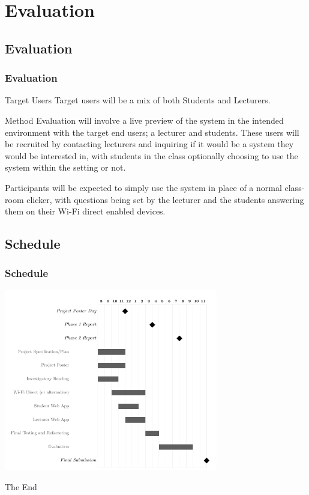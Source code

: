 \documentclass{beamer}
\begin{document}

\section{Evaluation}
\subsection{Evaluation}
\begin{frame}
\frametitle{Evaluation}
\begin{block}{Target Users}
Target users will be a mix of both Students and Lecturers.
\end{block}

\begin{block}{Method}
Evaluation will involve a live preview of the system in the intended environment with the target end users; a lecturer and students. These users will be recruited by contacting lecturers and inquiring if it would be a system they would be interested in, with students in the class optionally choosing to use the system within the setting or not.

Participants will be expected to simply use the system in place of a normal class-room clicker, with questions being set by the lecturer and the students answering them on their Wi-Fi direct enabled devices. \\

\end{block}

\end{frame}

\begin{frame}
\section{Schedule}
\frametitle{Schedule}
\begin{centering}
    \includegraphics[width=0.7\textwidth]{schedule.png}
\end{centering}
\end{frame}


\begin{frame}
\Huge{\centerline{The End}}
\end{frame}

\end{document}
